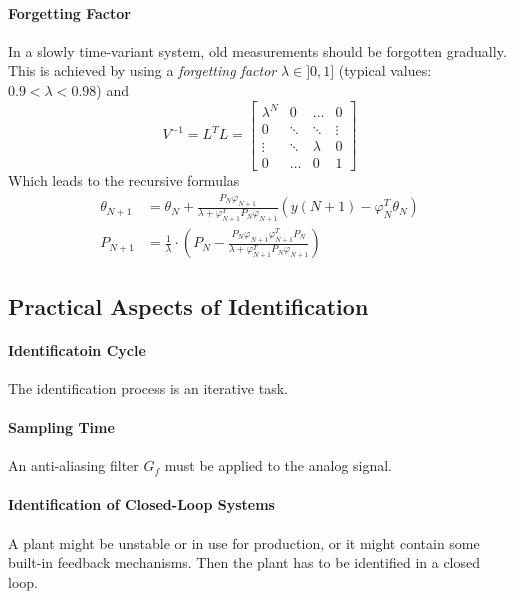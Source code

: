 \paragraph{Forgetting Factor}
In a slowly time-variant system, old measurements should be forgotten gradually. 
This is achieved by using a \emph{forgetting factor} $\lambda\in]0,1]$ 
(typical values: $0.9 < \lambda < 0.98$) and
\[
    V^{-1} = L^T L = \begin{bmatrix}
        \lambda^N & 0 &\dots & 0 \\
        0 & \ddots & \ddots & \vdots \\
        \vdots & \ddots & \lambda & 0 \\
        0 & \dots & 0 & 1
    \end{bmatrix}
\]
Which leads to the recursive formulas
\begin{align*}
    \theta_{N+1} &= \theta_N + \frac{P_N \varphi_{N+1}}{\lambda + \varphi_{N+1}^T P_N \varphi_{N+1}}\left( y(N+1) - \varphi_N^T \theta_N \right) \\
    P_{N+1} &= \frac{1}{\lambda} \cdot \left(P_N - \frac{P_N \varphi_{N+1} \varphi_{N+1}^T P_N}{\lambda + \varphi_{N+1}^T P_N \varphi_{N+1}}\right)
\end{align*}

\subsection{Practical Aspects of Identification}

\paragraph{Identificatoin Cycle}The identification process is an iterative task.
\paragraph{Sampling Time}An anti-aliasing filter $G_{f}$ must be applied to the analog signal.
\paragraph{Identification of Closed-Loop Systems} A plant might be unstable or
in use for production, or it might contain some built-in feedback mechanisms.
Then the plant has to be identified in a closed loop.